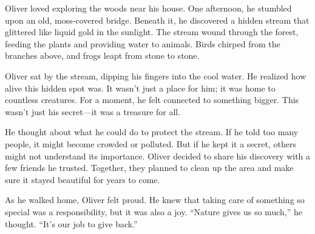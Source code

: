 \documentclass[12pt]{article}
\begin{document}
\begin{tcolorbox}[colframe=black!60, colback=white, 
coltitle=black, colbacktitle=black!15, fonttitle=\bfseries\Large, 
title=Oliver's Discovery, halign title=center, left=10pt, right=10pt, top=10pt, bottom=15pt]

Oliver loved exploring the woods near his house. One afternoon, he stumbled upon an old, moss-covered bridge. Beneath it, he discovered a hidden stream that glittered like liquid gold in the sunlight. The stream wound through the forest, feeding the plants and providing water to animals. Birds chirped from the branches above, and frogs leapt from stone to stone. 

Oliver sat by the stream, dipping his fingers into the cool water. He realized how alive this hidden spot was. It wasn’t just a place for him; it was home to countless creatures. For a moment, he felt connected to something bigger. This wasn’t just his secret—it was a treasure for all.

He thought about what he could do to protect the stream. If he told too many people, it might become crowded or polluted. But if he kept it a secret, others might not understand its importance. Oliver decided to share his discovery with a few friends he trusted. Together, they planned to clean up the area and make sure it stayed beautiful for years to come.

As he walked home, Oliver felt proud. He knew that taking care of something so special was a responsibility, but it was also a joy. “Nature gives us so much,” he thought. “It’s our job to give back.”



\end{tcolorbox}
\end{document}

